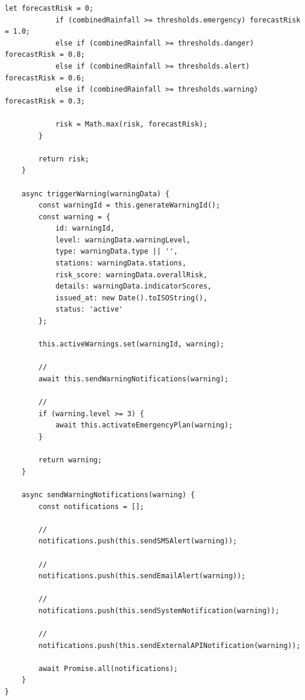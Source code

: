 \begin{lstlisting}[style=javascript]
            let forecastRisk = 0;
            if (combinedRainfall >= thresholds.emergency) forecastRisk = 1.0;
            else if (combinedRainfall >= thresholds.danger) forecastRisk = 0.8;
            else if (combinedRainfall >= thresholds.alert) forecastRisk = 0.6;
            else if (combinedRainfall >= thresholds.warning) forecastRisk = 0.3;
            
            risk = Math.max(risk, forecastRisk);
        }
        
        return risk;
    }
    
    async triggerWarning(warningData) {
        const warningId = this.generateWarningId();
        const warning = {
            id: warningId,
            level: warningData.warningLevel,
            type: warningData.type || '',
            stations: warningData.stations,
            risk_score: warningData.overallRisk,
            details: warningData.indicatorScores,
            issued_at: new Date().toISOString(),
            status: 'active'
        };
        
        this.activeWarnings.set(warningId, warning);
        
        // 
        await this.sendWarningNotifications(warning);
        
        // 
        if (warning.level >= 3) {
            await this.activateEmergencyPlan(warning);
        }
        
        return warning;
    }
    
    async sendWarningNotifications(warning) {
        const notifications = [];
        
        // 
        notifications.push(this.sendSMSAlert(warning));
        
        // 
        notifications.push(this.sendEmailAlert(warning));
        
        // 
        notifications.push(this.sendSystemNotification(warning));
        
        // 
        notifications.push(this.sendExternalAPINotification(warning));
        
        await Promise.all(notifications);
    }
}
\end{lstlisting}

\hypertarget{section-106}{%
\subsubsection{}\label{section-106}}

